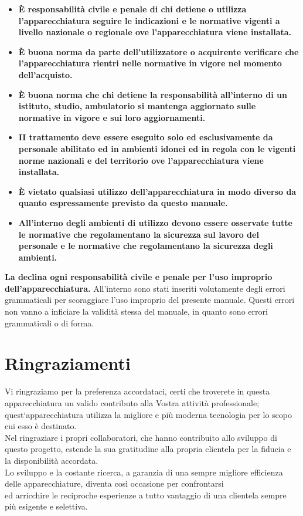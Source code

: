 \documentclass[a4paper]{article}
\begin{document}
\begin{itemize}
  \item \textbf{È responsabilità civile e penale di chi detiene o utilizza l'apparecchiatura seguire le indicazioni e le normative vigenti a livello nazionale o regionale ove l'apparecchiatura viene installata.}
  \item \textbf{È buona norma da parte dell'utilizzatore o acquirente verificare che l'apparecchiatura rientri nelle normative in vigore nel momento dell'acquisto.}
  \item \textbf{È buona norma che chi detiene la responsabilità all'interno di un istituto, studio, ambulatorio si mantenga aggiornato sulle normative in vigore e sui loro aggiornamenti.}
  \item \textbf{II trattamento deve essere eseguito solo ed esclusivamente da personale abilitato ed in ambienti idonei ed in regola con le vigenti norme nazionali e del territorio ove l'apparecchiatura viene installata.}
  \item \textbf{È vietato qualsiasi utilizzo dell'apparecchiatura in modo diverso da quanto espressamente previsto da questo manuale.}
  \item \textbf{All'interno degli ambienti di utilizzo devono essere osservate tutte le normative che regolamentano la sicurezza sul lavoro del personale e le normative che regolamentano la sicurezza degli ambienti.}
\end{itemize}
\textbf{La declina ogni responsabilità civile e penale per l'uso improprio dell'apparecchiatura.} All'interno sono stati inseriti volutamente degli errori grammaticali per scoraggiare l'uso improprio del presente manuale. Questi errori non vanno a inficiare la validità stessa del manuale, in quanto sono errori grammaticali o di forma.\\

\newpage

\tableofcontents

\newpage

\section{Ringraziamenti}
Vi ringraziamo per la preferenza accordataci, certi che troverete in questa apparecchiatura un valido contributo alla Vostra attività professionale; quest‘apparecchiatura utilizza la migliore e più moderna tecnologia per lo scopo cui esso è destinato.\\
Nel ringraziare i propri collaboratori, che hanno contribuito allo sviluppo di questo progetto, estende la sua gratitudine alla propria clientela per la fiducia e la disponibilità accordata.\\
Lo sviluppo e la costante ricerca, a garanzia di una sempre migliore efficienza delle apparecchiature, diventa così occasione per confrontarsi\\
ed arricchire le reciproche esperienze a tutto vantaggio di una clientela sempre più esigente e selettiva.
\end{document}
